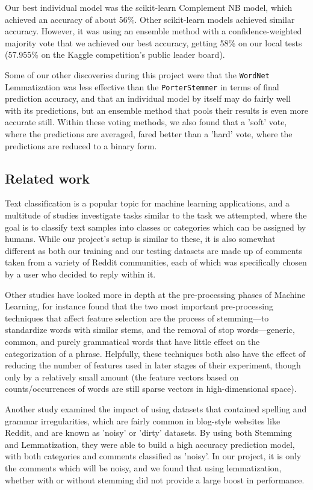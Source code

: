 \documentclass[letterpaper, 11pt]{article}
\begin{document}
Our best individual model was the scikit-learn Complement NB model, which achieved an accuracy of about $56\%$.  Other scikit-learn models achieved similar accuracy. However, it was using an ensemble method with a confidence-weighted majority vote that we achieved our best accuracy, getting 58\% on our local tests (57.955\% on the Kaggle competition's public leader board).

Some of our other discoveries during this project were that the \texttt{WordNet} Lemmatization was less effective than the \texttt{PorterStemmer} in terms of final prediction accuracy, and that an individual model by itself may do fairly well with its predictions, but an ensemble method that pools their results is even more accurate still. Within these voting methods, we also found that a 'soft' vote, where the predictions are averaged, fared better than a 'hard' vote, where the predictions are reduced to a binary form. 

\subsection*{Related work}

Text classification is a popular topic for machine learning applications, and a multitude of studies investigate tasks similar to the task we attempted, where the goal is to classify text samples into classes or categories which can be assigned by humans.\cite{Boiy:2009} While our project's setup is similar to these, it is also somewhat different as both our training and our testing datasets are made up of comments taken from a variety of Reddit communities, each of which was specifically chosen by a user who decided to reply within it. 

Other studies have looked more in depth at the pre-processing phases of Machine Learning, for instance \cite{Sharma:2015} found that the two most important pre-processing techniques that affect feature selection are the process of stemming---to standardize words with similar stems, and the removal of stop words---generic, common, and purely grammatical words that have little effect on the categorization of a phrase. Helpfully, these techniques both also have the effect of reducing the number of features used in later stages of their experiment, though only by a relatively small amount (the feature vectors based on counts/occurrences of words are still sparse vectors in high-dimensional space). 

Another study examined the impact of using datasets that contained spelling and grammar irregularities, which are fairly common in blog-style websites like Reddit, and are known as 'noisy' or 'dirty' datasets.\cite{allstate} By using both Stemming and Lemmatization, they were able to build a high accuracy prediction model, with both categories and comments classified as 'noisy'. In our project, it is only the comments which will be noisy, and we found that using lemmatization, whether with or without stemming did not provide a large boost in performance.
\end{document}
